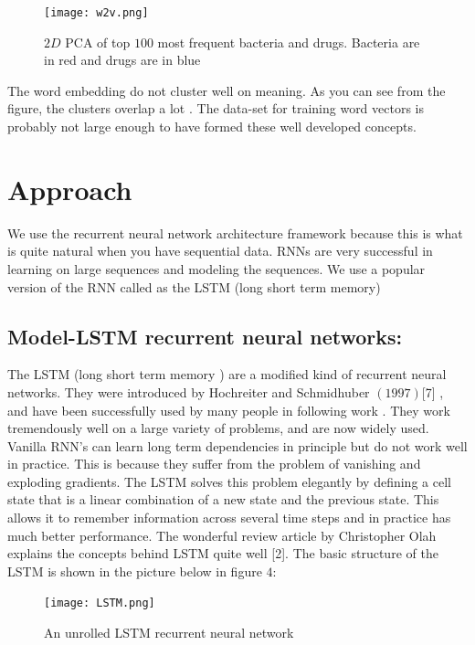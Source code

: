 \documentclass{article} %
\begin{document}
\begin{figure}[h]
\begin{center}
\texttt{[image: w2v.png]}
\end{center}
\caption{$2D $ PCA of top $100$ most frequent bacteria and drugs. Bacteria are in red and drugs are in blue}
\end{figure}


The word embedding do not cluster well on meaning. As you can see from the figure, the clusters overlap a lot . The data-set for training word vectors is probably not large enough to have formed these well developed concepts.


\section{Approach}
We use the recurrent neural network architecture framework because this is what is quite natural when you have sequential data. RNNs are very successful in learning on large sequences and modeling the sequences. We use a popular version of the RNN called as the LSTM (long short term memory) 
\subsection{Model-\textbf{LSTM} recurrent neural networks:}
The LSTM (long short term memory ) are a modified kind of recurrent neural networks. They were introduced by Hochreiter and Schmidhuber $(1997)$[7] , and have been successfully used by many people in following work . They work tremendously well on a large variety of problems, and are now widely used. 
Vanilla RNN's can learn long term dependencies in principle but do not work well in practice. This is because they suffer from the problem of vanishing and exploding gradients. The LSTM solves this problem elegantly by defining a cell state that is a linear combination of a new state and the previous state. This allows it to remember information across several time steps and in practice has much better performance. The wonderful review article by Christopher Olah explains the concepts behind LSTM quite well [2].
The basic structure of the LSTM is shown in the picture below in figure $4$:

\begin{figure}[h]
\begin{center}
\texttt{[image: LSTM.png]}
\end{center}
\caption{An unrolled LSTM recurrent neural network}
\end{figure}
\end{document}
